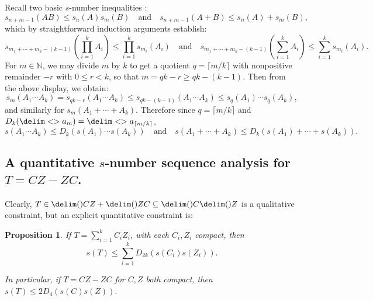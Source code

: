 \documentclass[10pt,reqno]{amsart}
\newtheorem{proposition}[theorem]{Proposition}
\theoremstyle{remark}
\newcommand{\seq}{\delim<>}
\newcommand{\ideal}{\delim()}
\numberwithin{equation}{section}
\begin{document}
Recall two basic $s$-number inequalities \cite[Corollary 2.2]{GK-1969-ITTTOLNO}:
\begin{equation*}
  s_{n+m-1}(AB) \le s_n(A)s_m(B) \quad \text{and}\quad s_{n+m-1}(A+B) \le s_n(A) + s_m(B),
\end{equation*}
which by straightforward induction arguments establish:
\begin{equation*}
  s_{m_1 + \cdots + m_k - (k-1)}\left(\prod^k_{i=1} A_i\right)  \le  \prod^k_{i=1}s_{m_i}(A_i) \quad \text{and} \quad  s_{m_1 + \cdots + m_k - (k-1)}\left(\sum^k_{i=1} A_i\right)  \le  \sum^k_{i=1}s_{m_i}(A_i).
\end{equation*}
For $m \in \mathbb{N}$, we may divide $m$ by $k$ to get a quotient $q = \lceil m/k \rceil$ with nonpositive remainder $-r$ with $0 \le r < k$, so that $m = qk - r \ge qk - (k-1)$.
Then from the above display, we obtain:
\begin{equation*}
  s_m(A_1 \cdots A_k) = s_{qk - r}(A_1 \cdots A_k) \le s_{qk - (k-1)}(A_1 \cdots A_k) \le s_q(A_1) \cdots s_q(A_k),
\end{equation*}
and similarly for $s_m(A_1 + \cdots + A_k)$.
Therefore since $q = \lceil m/k \rceil$ and $D_k(\seq{a_m}) = \seq{a_{\lceil m/k \rceil}}$,
\begin{equation}
  \label{eq:ampliation-product-sum-s-numbers}
  s(A_1 \cdots A_k) \le D_k(s(A_1) \cdots s(A_k)) \quad\text{and}\quad s(A_1 + \cdots + A_k) \le D_k(s(A_1) + \cdots + s(A_k)).
\end{equation}

\subsection*{A quantitative $s$-number sequence analysis for $T = CZ -ZC$.}

\hfill

\noindent
Clearly, $T \in \ideal{CZ} + \ideal{ZC} \subseteq \ideal{C} \ideal{Z}$ is a qualitative constraint, but an explicit quantitative constraint is:

\begin{proposition}
  \label{$s$-number proposition}
  If $T = \sum_{i=1}^k C_i Z_i$, with each $C_i, Z_i$ compact, then
  \begin{equation*}
    s(T) \le \sum_{i=1}^k D_{2k} (s(C_i) s(Z_i)).
  \end{equation*}

  In particular, if $T = CZ-ZC$ for $C,Z$ both compact, then $s(T) \le 2 D_4(s(C) s(Z))$.
\end{proposition}
\end{document}
